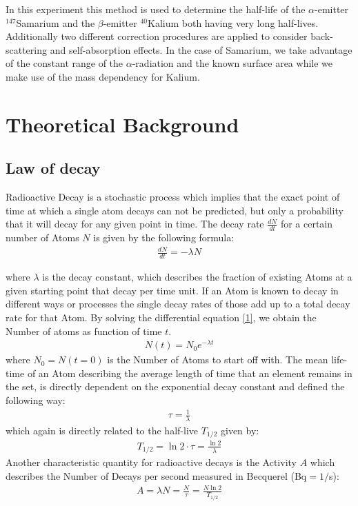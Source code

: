 \documentclass[12pt]{article}
\begin{document}
In this experiment this method is used to determine the half-life of the $\alpha$-emitter ${}^{147}$Samarium and the $\beta$-emitter ${}^{40}$Kalium both having very long half-lives. Additionally two different correction procedures are applied to consider back-scattering and self-absorption effects. 
In the case of Samarium, we take advantage of the constant range of the  $\alpha$-radiation and the known surface area while we make use of the mass dependency for Kalium.











\newpage
\section{Theoretical Background}

\subsection{Law of decay}\label{zerfallsgesetz}

Radioactive Decay is a stochastic process which implies that the exact point of time at which a single atom decays can not be predicted, but only a probability that it will decay for any given point in time.  
The decay rate $\frac{dN}{dt}$ for a certain number of Atoms $N$ is given by the following formula:
\begin{align}
\frac{dN}{dt}=-\lambda N \label{1}
\end{align}

where $\lambda$ is the decay constant, which describes the fraction of existing Atoms at a given starting point that decay per time unit.
If an Atom is known to decay in different ways or processes the single decay rates of those add up to a total decay rate for that Atom.
By solving the differential equation \ref{1}, we obtain the Number of atoms as function of time $t$.
\begin{align}
N(t)=N_0e^{-\lambda t}
\end{align}
where $N_0=N(t=0)$ is the Number of Atoms to start off with.
The mean life-time of an Atom describing the average length of time that an element remains in the set, is directly dependent on the exponential decay constant and defined the following way:
\begin{align}
\tau=\frac{1}{\lambda}
\end{align}
which again is directly related to the half-live $T_{1/2}$ given by:
\begin{align}
T_{1/2} = \ln2\cdot \tau = \frac{\ln2}{\lambda}
\end{align}
Another characteristic quantity for radioactive decays is the Activity $A$ which describes the Number of Decays per second measured in Becquerel (Bq$=1/$s):
\begin{align}
A = \lambda N = \frac{N}{\tau} = \frac{N\ln2}{T_{1/2}}\label{activity}
\end{align}
\end{document}

